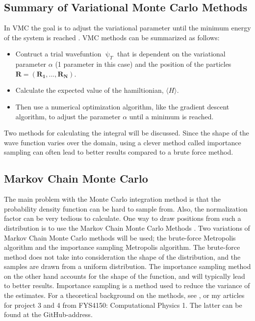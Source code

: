 \subsection{Summary of Variational Monte Carlo Methods}
In VMC the goal is to adjust the variational parameter until the minimum energy of the system is reached \cite{mhj}. VMC methods can be summarized as follows: 
\begin{itemize}
    \item Contruct a trial wavefuntion $\uppsi_T$ that is dependent on the variational parameter $\alpha$ (1 parameter in this case) and the position of the particles $\boldsymbol{R} = (\boldsymbol{R_1}, ..., \boldsymbol{R_N})$. 
    \item Calculate the expected value of the hamiltionian, $\langle H \rangle$.
    \item Then use a numerical optimization algorithm, like the gradient descent algorithm, to adjust the parameter $\alpha$ until a minimum is reached. 
\end{itemize}
Two methods for calculating the integral will be discussed. Since the shape of the wave function varies over the domain, using a clever method called importance sampling can often lead to better results compared to a brute force method. 



\subsection{Markov Chain Monte Carlo}
The main problem with the Monte Carlo integration method is that the probability density function can be hard to sample from. Also, the normalization factor can be very tedious to calculate. One way to draw positions from such a distribution is to use the Markov Chain Monte Carlo Methods \cite{compstat}. Two variations of Markov Chain Monte Carlo methods will be used; the brute-force Metropolis algorithm and the importance sampling Metropolis algorithm. The brute-force method does not take into consideration the shape of the distribution, and the samples are drawn from a uniform distribution. The importance sampling method on the other hand accounts for the shape of the function, and will typically lead to better results. Importance sampling is a method used to reduce the variance of the estimates. For a theoretical background on the methods, see \cite{mhj}, \cite{compstat} or my articles for project 3 and 4 from FYS4150: Computational Physics 1. The latter can be found at the GitHub-address.
